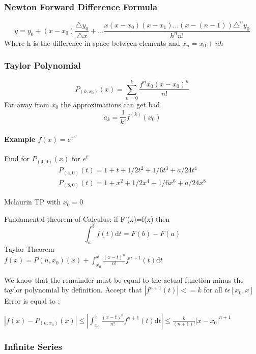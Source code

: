 \documentclass{article}
\begin{document}
\subsubsection{Newton Forward Difference Formula}
\begin{equation}
y=y_0+(x-x_0)\frac{\triangle y_0}{\triangle x}+ \dots \frac{x(x-x_0)(x-x_1)...(x-(n-1))\triangle^n y_0}{h^n n!}
\end{equation}
Where h is the difference in space between elements and $x_n=x_0+nh$
\subsubsection{Taylor Polynomial}
\begin{equation}
P_(k,x_0)(x)=\sum\limits_{n=0}^k \frac{f^n x_0(x-x_0)^n}{n!}
\end{equation} 
Far away from $x_0$ the approximations can get bad.
\begin{equation}
a_k=\frac{1}{k!} f^{(k)}(x_0)
\end{equation}
\paragraph{Example $f(x)=e^{x^2}$}
Find for $P_{(4,0)}(x)$ for $e^t$\newline
\begin{align}
P_{(4,0)}(t)=1+t+1/2t^2+1/6t^3+a/24t^4\\
P_{(8,0)}(t)=1+x^2+1/2x^4+1/6x^6+a/24x^8
\end{align}

Mclaurin TP with $x_0=0$



Fundamental theorem of Calculus: if F'(x)=f(x) 
then\\
\begin{equation}
\int_a^b f(t) \mathrm{d}t=F(b)-F(a)
\end{equation}
Taylor Theorem\\
$f(x)=P{(n,x_0)}(x)+\int_{x_0}^x \frac{(x-t)^n}{n!} f^{n+1}(t) \mathrm{d}t$

We know that the remainder must be equal to the actual function minus the taylor polynomial by definition. 
Accept that $|f^{n+1}(t)|<=k$ for all $t \epsilon [x_0,x]$\\
Error is equal to :

$|f(x)-P_{(n,x_0)}(x)| \leq | \int_{x_0}^x \frac{(x-t)^n}{n!} f^{n+1}(t) \mathrm{d}t| \leq \frac{k}{(n+1)!} |x-x_0|^{n+1}$
\subsubsection{Infinite Series}
\end{document}
